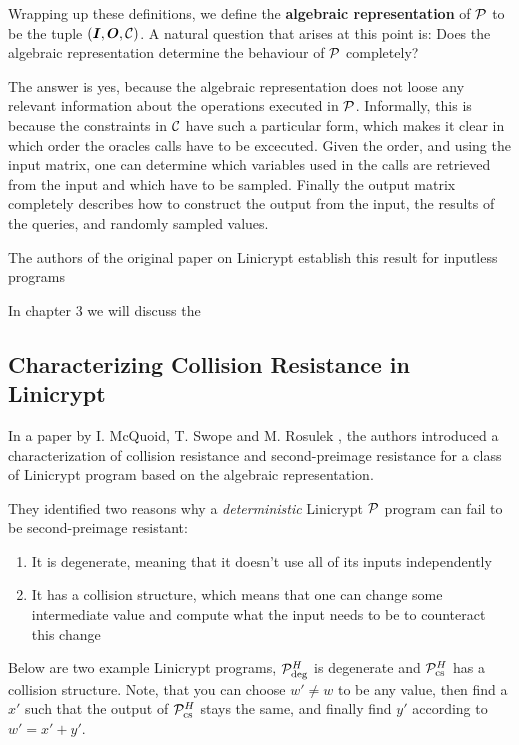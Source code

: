 Wrapping up these definitions,
we define the \textbf{algebraic representation} of $\P$ to be the tuple $(\Inp, \O, \C)$.
A natural question that arises at this point is:
Does the algebraic representation determine the behaviour of $\P$ completely?

The answer is yes, because the algebraic representation does not loose any relevant information about the operations executed in $\P$.
Informally, this is because the constraints in $\C$ have such a particular form, which makes it clear in which order the oracles calls have to be excecuted.
Given the order, and using the input matrix, one can determine which variables used in the calls are retrieved from the input and which have to be sampled.
Finally the output matrix completely describes how to construct the output from the input,
the results of the queries, and randomly sampled values. 

The authors of the original paper on Linicrypt \cite{C:CarRos16} establish this result for inputless programs

In chapter 3 we will discuss the 


\subsection{Characterizing Collision Resistance in Linicrypt}

In a paper by I. McQuoid, T. Swope and M. Rosulek
\cite[Characterizing Collision and Second-Preimage Resistance in Linicrypt]{RMS20},
the authors introduced a characterization of collision resistance
and second-preimage resistance for a class of Linicrypt program based on the algebraic representation.

They identified two reasons why a \textit{deterministic} Linicrypt $\P$ program can fail to be second-preimage resistant:
\begin{enumerate}
  \item It is degenerate, meaning that it doesn't use all of its inputs independently
  \item It has a collision structure,
    which means that one can change some intermediate value and compute what the input needs to be to counteract this change
\end{enumerate}

Below are two example Linicrypt programs, $\P^\H_\textrm{deg}$ is degenerate and $\P^\H_\textrm{cs}$ has a collision structure.
Note, that you can choose $w' \neq w$ to be any value,
then find a $x'$ such that the output of $\P^\H_{\textrm{cs}}$ stays the same,
and finally find $y'$ according to $w' = x' + y'$.

